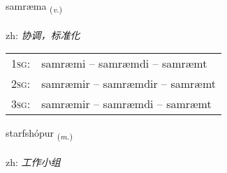 \documentclass[frontgrid, backgrid]{flacards}\usepackage[]{graphicx}\usepackage[]{color}
\begin{document}
\renewcommand{\flhead}{\vskip5pt \fboxsep=0pt {\small\bfseries\footnotesize Sagnorð | 动词}}
\renewcommand{\fcfoot}{\vskip5pt \fboxsep=0pt \hspace{2pt}{\small\bfseries\footnotesize 2K}}

\renewcommand{\blhead}{\vskip5pt {\small\bfseries\footnotesize Sagnorð | 动词 }}
\renewcommand{\bcfoot}{\vskip5pt \hspace{2pt}{\small\bfseries\footnotesize 2K}}


{samræma \small{\textsubscript{(\textit{v.})}} \\[1ex] %
\textphonetic{[samraima]} \\
zh: \emph{协调，标准化} \\  [2ex]
\renewcommand*{\arraystretch}{0.8}
\begin{tabular}{p{1cm}l}
\textsc{1sg}: & samræmi -- samræmdi -- samræmt \\ 
\textsc{2sg}: & samræmir -- samræmdir -- samræmt \\ 
\textsc{3sg}: & samræmir -- samræmdi -- samræmt \\ 
\end{tabular}
}

\renewcommand{\flhead}{\vskip5pt \fboxsep=0pt {\small\bfseries\footnotesize Nafnorð | 名词}}
\renewcommand{\fcfoot}{\vskip5pt \fboxsep=0pt \hspace{2pt}{\small\bfseries\footnotesize 2K}}

\renewcommand{\blhead}{\vskip5pt {\small\bfseries\footnotesize Nafnorð | 名词 }}
\renewcommand{\bcfoot}{\vskip5pt \hspace{2pt}{\small\bfseries\footnotesize 2K}}


{starfshópur \small{\textsubscript{(\textit{m.})}} \\[1ex] %
\textphonetic{[starfshoupʏr]} \\
zh: \emph{工作小组} \\  [2ex]
\renewcommand*{\arraystretch}{0.8}
}
\end{document}
